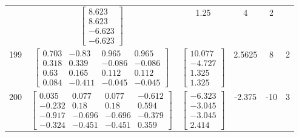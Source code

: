 \documentclass[a4paper,12pt]{article}
\begin{document}
\begin{tabular}{c c c c c c}
&
$\begin{bmatrix} 8.623 \\ 8.623 \\ -6.623 \\ -6.623 \end{bmatrix}$
&
1.25
&
4
&
2
\\
199
&
$\begin{bmatrix} 0.703 & -0.83 & 0.965 & 0.965 \\ 0.318 & 0.339 & -0.086 & -0.086 \\ 0.63 & 0.165 & 0.112 & 0.112 \\ 0.084 & -0.411 & -0.045 & -0.045 \end{bmatrix}$
&
$\begin{bmatrix} 10.077 \\ -4.727 \\ 1.325 \\ 1.325 \end{bmatrix}$
&
2.5625
&
8
&
2
\\
200
&
$\begin{bmatrix} 0.035 & 0.077 & 0.077 & -0.612 \\ -0.232 & 0.18 & 0.18 & 0.594 \\ -0.917 & -0.696 & -0.696 & -0.379 \\ -0.324 & -0.451 & -0.451 & 0.359 \end{bmatrix}$
&
$\begin{bmatrix} -6.323 \\ -3.045 \\ -3.045 \\ 2.414 \end{bmatrix}$
&
-2.375
&
-10
&
3
\\
\end{tabular} \egroup \newpage
\end{document}
